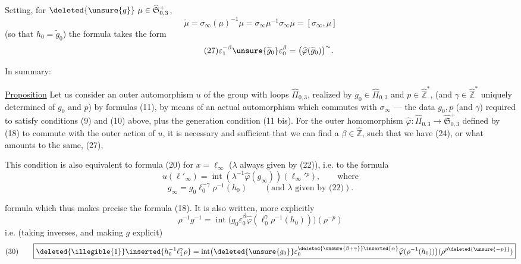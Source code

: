 Setting, for $\deleted{\unsure{g}}\ \mu\in
\widehat{\mathfrak S}_{0,3}^{+}$,
\[
\tag{26}
\widetilde\mu=\sigma_\infty(\mu)^{-1}\mu
=\sigma_\infty\mu^{-1}\sigma_\infty\mu=[\sigma_\infty,\mu]
\]
(so that $h_0=\widetilde g_0$) the formula  takes the form
\[
\tag{27}
\varepsilon_1^{-\beta}\unsure{\widetilde g_0}\varepsilon_0^\beta
=\bigl(\widehat\varphi(\widetilde g_0)\bigr)^{\sim}.
\]


In summary:

\uline{Proposition} Let us consider an outer automorphism $u$ of the group with loops
$\widehat\Pi_{0,3}$, realized by $g_0\in\widehat\Pi_{0,3}$
and $p\in\widehat{\mathbb Z}^{*}$,
(and $\gamma\in\widehat{\mathbb Z}^{*}$ uniquely determined
 of $g_0$ and $p$)
by formulas (11), by means of an actual automorphism
 which commutes with $\sigma_\infty$ ---
the data $g_0,p$ (and $\gamma$)  
required to satisfy conditions (9) and (10) above,
plus the generation condition (11 bis).
For the outer homomorphism
$\widehat\varphi:\widehat\Pi_{0,3}\longrightarrow
\widehat{\mathfrak S}_{0,3}^{+}$
defined by (18) to commute with the outer action of $u$,
it is necessary and sufficient that we can find a $\beta\in\widehat{\mathbb Z}$,
such that we have (24), or what amounts to the same, (27),

This condition  is also equivalent to formula
(20) for $x=\ell_\infty$ ($\lambda$  always given by (22)),
 i.e. to the formula
\[
\tag{28}
u(\ell'_\infty)=\operatorname{int}(\lambda^{-1}\widehat\varphi(g_\infty))
 (\ell_\infty'{}^p),\qquad\text{where}
\]
\[
\tag{29}
g_\infty=g_0\ell_0^{-\gamma}\rho^{-1}(h_0)
\qquad(\text{and }\lambda\text{ given by (22)}).
\]


formula which thus makes precise the  formula (18). It is also written, more explicitly
\[
\rho^{-1}g^{-1}
=\operatorname{int}\bigl(g_0\varepsilon_0^{\beta}
\widehat\varphi(\ell_0^{\gamma}\rho^{-1}(h_0))\bigr)
(\rho^{-p})
\]
i.e. (taking inverses, and making $g$ explicit)
\[
(30)\qquad
\boxed{
\deleted{\illegible{1}}\inserted{h_0^{-1}\ell_1^{\gamma}\rho}
=\operatorname{int}\bigl(
\deleted{\unsure{g_0}}\varepsilon_0^{\deleted{\unsure{\beta+\gamma}}\inserted{\alpha}}
\widehat\varphi(\rho^{-1}(h_0))\bigr)
(\rho^{p\deleted{\unsure{-p}}})
}
\]

